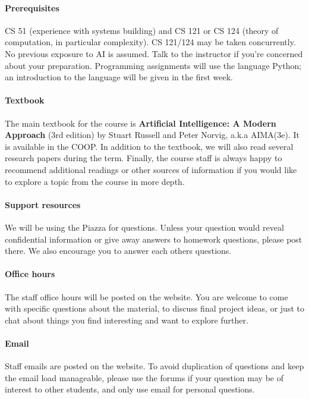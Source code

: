 \documentclass[11pt]{article}
\begin{document}
\paragraph{Prerequisites}

CS 51 (experience with systems building) and CS 121 or CS 124 (theory
of computation, in particular complexity).  CS 121/124 may be taken
concurrently. No previous exposure to AI is assumed. Talk to the
instructor if you're concerned about your preparation.  Programming
assignments will use the language Python; an introduction to the
language will be given in the first week.

\paragraph{Textbook}

The main textbook for the course is \textbf{Artificial Intelligence: A
  Modern Approach} (3rd edition) by Stuart Russell and Peter Norvig,
a.k.a AIMA(3e). It is available in the COOP. In addition to the
textbook, we will also read several research papers during the
term. Finally, the course staff is always happy to recommend
additional readings or other sources of information if you would like
to explore a topic from the course in more depth.

\paragraph{Support resources}

We will be using the Piazza for questions. Unless your question would reveal confidential information or give away answers to homework questions, please post there. We also encourage you to answer each others questions.

\paragraph{Office hours}
The staff office hours will be posted on the website. You are welcome to come with specific questions about the material, to discuss final project ideas, or just to chat about things you find interesting and want to explore further.

\paragraph{Email} Staff emails are posted on the website. To avoid duplication of questions and keep the email load manageable, please use the forums if your question may be of interest to other students, and only use email for personal questions.
\end{document}
